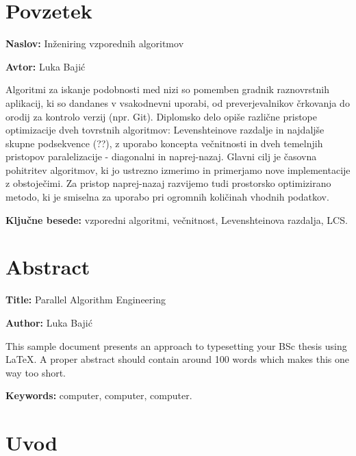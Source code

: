 \documentclass[a4paper,12pt,openright]{book}
\newcommand{\ttitle}{Inženiring vzporednih algoritmov}
\newcommand{\ttitleEn}{Parallel Algorithm Engineering}
\newcommand{\tauthor}{Luka Bajić}
\newcommand{\tkeywords}{vzporedni algoritmi, večnitnost, Levenshteinova razdalja, LCS}
\newcommand{\tkeywordsEn}{computer, computer, computer}
\newcommand{\clearemptydoublepage}{\newpage{\pagestyle{empty}\cleardoublepage}}
\begin{document}
\clearemptydoublepage

{}
\chapter*{Povzetek}

\noindent\textbf{Naslov:} \ttitle
\bigskip

\noindent\textbf{Avtor:} \tauthor
\bigskip

\noindent Algoritmi za iskanje podobnosti med nizi so pomemben gradnik raznovrstnih aplikacij, ki so dandanes v vsakodnevni uporabi, od preverjevalnikov črkovanja do orodij za kontrolo verzij (npr. Git). Diplomsko delo opiše različne pristope optimizacije dveh tovrstnih algoritmov: Levenshteinove razdalje in najdaljše skupne podsekvence (??), z uporabo koncepta večnitnosti in dveh temelnjih pristopov paralelizacije - diagonalni in naprej-nazaj. Glavni cilj je časovna pohitritev algoritmov, ki jo ustrezno izmerimo in primerjamo nove implementacije z obstoječimi. Za pristop naprej-nazaj razvijemo tudi prostorsko optimizirano metodo, ki je smiselna za uporabo pri ogromnih količinah vhodnih podatkov. 

\bigskip

\noindent\textbf{Ključne besede:} \tkeywords.
\clearemptydoublepage

{}
\chapter*{Abstract}

\noindent\textbf{Title:} \ttitleEn
\bigskip

\noindent\textbf{Author:} \tauthor
\bigskip

\noindent This sample document presents an approach to typesetting your BSc thesis using \LaTeX. 
A proper abstract should contain around 100 words which makes this one way too short.
\bigskip

\noindent\textbf{Keywords:} \tkeywordsEn.
\clearemptydoublepage

\mainmatter
\setcounter{page}{1}
\pagestyle{fancy}

\chapter{Uvod}
\end{document}
